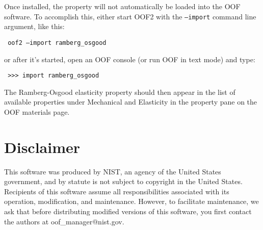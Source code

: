 \documentclass[10pt]{article}
\begin{document}
Once installed, the property will not automatically be loaded into the
OOF software. To accomplish this, either start OOF2 with the
{\tt--import} command line argument, like this:
\begin{obeylines}
\tt
  oof2 --import ramberg\_osgood
\end{obeylines}
or after it's started, open an OOF console (or run OOF in
text mode) and type:
\begin{obeylines}
\tt{
>>> import ramberg\_osgood
}
\end{obeylines}
The Ramberg-Osgood elasticity property should then appear in the list
of available properties under Mechanical and Elasticity in the
property pane on the OOF materials page.

\section{Disclaimer}

This software was produced by NIST, an agency of the United States
government, and by statute is not subject to copyright in the United
States. Recipients of this software assume all responsibilities
associated with its operation, modification, and maintenance. However,
to facilitate maintenance, we ask that before distributing modified
versions of this software, you first contact the authors at
oof\_manager@nist.gov.
\end{document}
